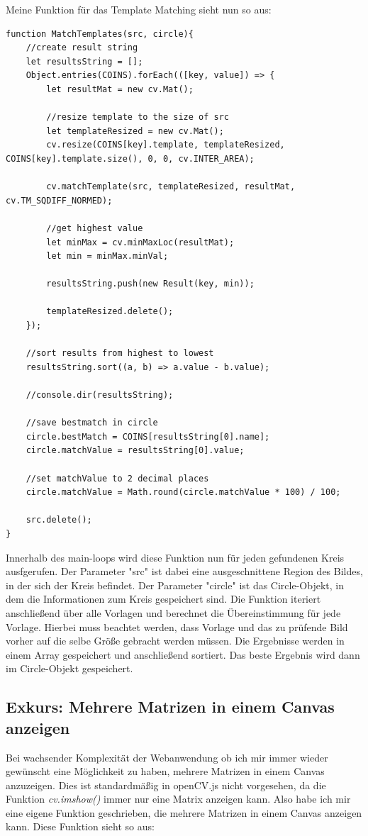 Meine Funktion für das Template Matching sieht nun so aus:
\begin{lstlisting}[style=JavaScript]
function MatchTemplates(src, circle){
    //create result string
    let resultsString = [];
    Object.entries(COINS).forEach(([key, value]) => {
        let resultMat = new cv.Mat();

        //resize template to the size of src
        let templateResized = new cv.Mat();
        cv.resize(COINS[key].template, templateResized, COINS[key].template.size(), 0, 0, cv.INTER_AREA);

        cv.matchTemplate(src, templateResized, resultMat, cv.TM_SQDIFF_NORMED);

        //get highest value
        let minMax = cv.minMaxLoc(resultMat);
        let min = minMax.minVal;

        resultsString.push(new Result(key, min));

        templateResized.delete();
    });

    //sort results from highest to lowest
    resultsString.sort((a, b) => a.value - b.value);

    //console.dir(resultsString);

    //save bestmatch in circle
    circle.bestMatch = COINS[resultsString[0].name];
    circle.matchValue = resultsString[0].value;

    //set matchValue to 2 decimal places
    circle.matchValue = Math.round(circle.matchValue * 100) / 100;

    src.delete();
}
\end{lstlisting}

Innerhalb des main-loops wird diese Funktion nun für jeden gefundenen Kreis ausfgerufen. Der Parameter "src" ist dabei eine ausgeschnittene Region des Bildes, in der sich der Kreis befindet. Der Parameter "circle" ist das Circle-Objekt, in dem die Informationen zum Kreis gespeichert sind. Die Funktion iteriert anschließend über alle Vorlagen und berechnet die Übereinstimmung für jede Vorlage. Hierbei muss beachtet werden, dass Vorlage und das zu prüfende Bild vorher auf die selbe Größe gebracht werden müssen. Die Ergebnisse werden in einem Array gespeichert und anschließend sortiert. Das beste Ergebnis wird dann im Circle-Objekt gespeichert.

\subsection{Exkurs: Mehrere Matrizen in einem Canvas anzeigen}
Bei wachsender Komplexität der Webanwendung ob ich mir immer wieder gewünscht eine Möglichkeit zu haben, mehrere Matrizen in einem Canvas anzuzeigen. Dies ist standardmäßig in openCV.js nicht vorgesehen, da die Funktion \textit{cv.imshow()} immer nur eine Matrix anzeigen kann. Also habe ich mir eine eigene Funktion geschrieben, die mehrere Matrizen in einem Canvas anzeigen kann. Diese Funktion sieht so aus:

